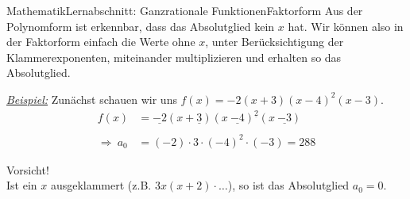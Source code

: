 \documentclass[11pt,twocolumn,oneside,openany,headings=optiontotoc,11pt,numbers=noenddot]{article}
\begin{document}
\begin{worksheet}{Mathematik}{Lernabschnitt: Ganzrationale Funktionen}{Faktorform}
		Aus der Polynomform ist erkennbar, dass das Absolutglied kein \(x\) hat. Wir können also in der Faktorform einfach die Werte ohne \(x\), unter Berücksichtigung der Klammerexponenten, miteinander multiplizieren und erhalten so das Absolutglied.\\
		\par\noindent
		\textit{\underline{Beispiel:}} Zunächst schauen wir uns \(f(x) = -2(x+3)(x-4)^2(x-3)\).
		\begin{align*}
			f(x) & = \underline{-2}(x+\underline{3})(x\ \underline{-4})^{\underline{2}}(x\ \underline{-3})\\
			\\
			\Rightarrow\ a_0 & = (-2)\cdot{}3\cdot{}(-4)^2\cdot{}(-3) = 288
		\end{align*}
		\begin{framed}
			\color{red}Vorsicht!\\
			\normalcolor
			Ist ein \(x\) ausgeklammert (z.B. \(3x(x+2)\cdot\ldots\)), so ist das Absolutglied \(a_0 = 0\).
		\end{framed}

\end{worksheet}
\end{document}
